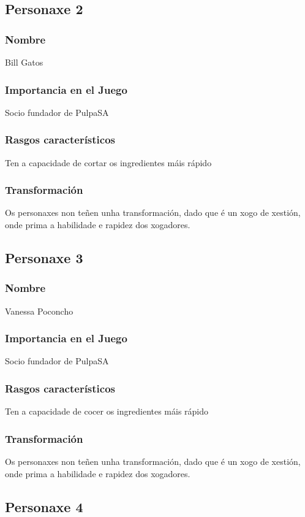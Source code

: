 \documentclass{report}  %
\begin{document}
\subsection{Personaxe 2}
\subsubsection{Nombre}
Bill Gatos
\subsubsection{Importancia en el Juego}
Socio fundador de PulpaSA \footnotemark[1]
\subsubsection{Rasgos característicos}
Ten a capacidade de cortar os ingredientes máis rápido \footnotemark[2]
\subsubsection{Transformación}
Os personaxes non teñen unha transformación, dado que é un xogo de xestión, onde prima a habilidade e rapidez dos xogadores.


\subsection{Personaxe 3}
\subsubsection{Nombre}
Vanessa Poconcho
\subsubsection{Importancia en el Juego}
Socio fundador de PulpaSA \footnotemark[1]

\subsubsection{Rasgos característicos}
Ten a capacidade de cocer os ingredientes máis rápido \footnotemark[2]
\subsubsection{Transformación}
Os personaxes non teñen unha transformación, dado que é un xogo de xestión, onde prima a habilidade e rapidez dos xogadores.


\subsection{Personaxe 4}
\end{document}
